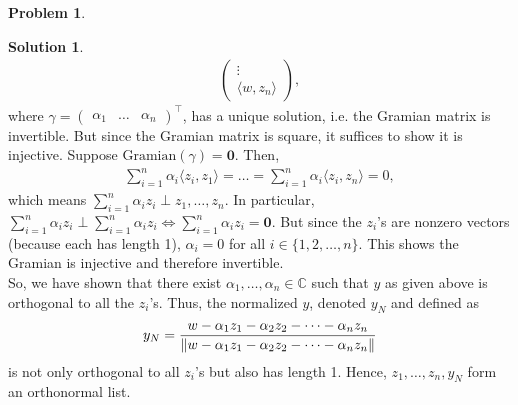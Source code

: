 \documentclass{book}
\theoremstyle{definition}
\newtheorem*{prob*}{Problem}
\newtheorem*{sln*}{Solution}
\newcommand{\la}{\langle}
\newcommand{\ra}{\rangle}
\begin{document}
\begin{prob*}
\begin{enumerate}
\begin{sln*}
\begin{align*}
\begin{pmatrix}
			\vdots\\
			\la w,z_n \ra
			\end{pmatrix},
			\end{align*}
			where $\gamma = \begin{pmatrix}
			\alpha_1&\dots&\alpha_n
			\end{pmatrix}^\top$, has a unique solution, i.e. the Gramian matrix is invertible. But since the Gramian matrix is square, it suffices to show it is injective. Suppose $\text{Gramian}(\gamma) = \mathbf{0}$. Then,
			\begin{align*}
			\sum^n_{i=1}\alpha_i \la z_i,z_1 \ra = \dots = \sum^n_{i=1}\alpha_i \la z_i,z_n \ra = 0,
			\end{align*}
			which means $\sum^n_{i=1}\alpha_i z_i \perp z_1,\dots, z_n$. In particular, $\sum^n_{i=1}\alpha_i z_i \perp \sum^n_{i=1}\alpha_i z_i \iff \sum^n_{i=1}\alpha_i z_i = \mathbf{0}$. But since the $z_i$'s are nonzero vectors (because each has length 1), $\alpha_i = 0$ for all $i \in  \{1,2,\dots,n \}$. This shows the Gramian is injective and therefore invertible. \\
			
			So, we have shown that there exist $\alpha_1,\dots,\alpha_n \in \mathbb{C}$ such that $y$ as given above is orthogonal to all the $z_i$'s. Thus, the normalized $y$, denoted $y_N$ and defined as
			\begin{align*}
			y_N = \frac{w - \alpha_1 z_1 - \alpha_2 z_2 - \dots - \alpha_n z_n}{\norm{w - \alpha_1 z_1 - \alpha_2 z_2 - \dots - \alpha_n z_n}}
			\end{align*}
			is not only orthogonal to all $z_i$'s but also has length 1. Hence, $z_1,\dots,z_n,y_N$ form an orthonormal list. \\
			

\end{sln*}
\end{enumerate}
\end{prob*}
\end{document}
